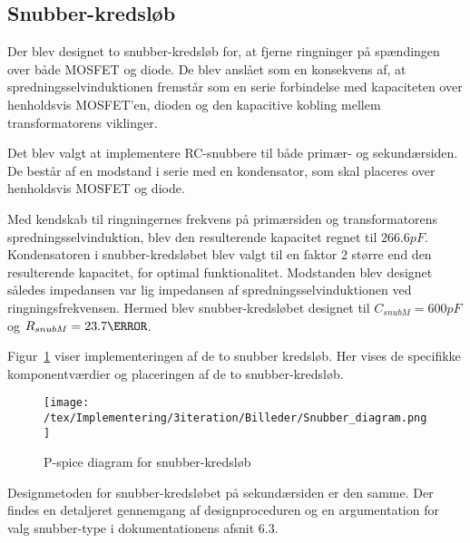 
\subsection{Snubber-kredsløb}
Der blev designet to snubber-kredsløb for, at fjerne ringninger på spændingen over både MOSFET og diode. De blev anslået som en konsekvens af, at spredningsselvinduktionen fremstår som en serie forbindelse med kapaciteten over henholdsvis MOSFET'en, dioden og den kapacitive kobling mellem transformatorens viklinger.  

Det blev valgt at implementere RC-snubbere til både primær- og sekundærsiden. De består af en modstand i serie med en kondensator, som skal placeres over henholdsvis MOSFET og diode. 

Med kendskab til ringningernes frekvens på primærsiden og transformatorens spredningsselvinduktion, blev den resulterende kapacitet regnet til $266.6pF$. Kondensatoren i snubber-kredsløbet blev valgt til en faktor 2 større end den resulterende kapacitet, for optimal funktionalitet\cite{snubber_design}. Modstanden blev designet således impedansen var lig impedansen af spredningsselvinduktionen ved ringningsfrekvensen. Hermed blev snubber-kredsløbet designet til $C_{snubM} = 600pF$ og $R_{snubM} = 23.7\ohm$. 

Figur~\ref{fig:snubber_diagram} viser implementeringen af de to snubber kredsløb. Her vises de specifikke komponentværdier og placeringen af de to snubber-kredsløb.

\begin{figure}[H]
	\centering
	\texttt{[image: /tex/Implementering/3iteration/Billeder/Snubber\_diagram.png]}
	\caption{P-spice diagram for snubber-kredsløb}
	\label{fig:snubber_diagram}
\end{figure}

\noindent Designmetoden for snubber-kredsløbet på sekundærsiden er den samme. Der findes en detaljeret gennemgang af designproceduren og en argumentation for valg snubber-type i dokumentationens afsnit 6.3.
